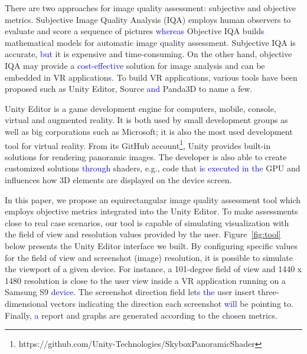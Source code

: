 \documentclass[10pt,conference]{IEEEtran}
\begin{document}
There are two approaches for image quality assessment: subjective and objective metrics. Subjective Image Quality Analysis (IQA) employs human observers to evaluate and score a sequence of pictures \textcolor{blue}{whereas} Objective IQA build\textcolor{blue}{s} mathematical models for automatic image quality assessment. Subjective IQA is accurate, \textcolor{blue}{but} it is expensive and time-consuming. On the other hand, objective IQA may provide a \textcolor{blue}{cost-effective} solution for image analysis and can be embedded in VR application\textcolor{blue}{s}. To build VR applications, various tools have been proposed such as Unity Editor, Source \textcolor{blue}{and} Panda3D to name a few. \par

Unity Editor is a game development engine for computers, mobile, console, virtual and augmented reality. It is both used by small development groups as well as big corporations such as Microsoft; it is also the most used development tool for virtual reality. From its GitHub account\footnote{https://github.com/Unity-Technologies/SkyboxPanoramicShader}, Unity provides built-in solutions for rendering panoramic images. The developer is also able to create customized solutions \textcolor{blue}{through} shaders, e.g., code that \textcolor{blue}{is executed in the}  GPU and influences how 3D elements are displayed on the device screen.

In this paper, we propose an equirectangular image quality assessment tool which employs objective metrics integrated into the Unity Editor. To make assessments close to real case scenarios, our tool is capable of simulating visualization with the field of view and resolution values provided by the user. Figure~\ref{fig:tool} below presents the Unity Editor interface we built. By configuring specific values for the field of view and screenshot (image) resolution, it is possible to simulate the viewport of a given device. For instance, a 101-degree field of view and 1440 x 1480 resolution is close to the user view inside a VR application running on a Samsung S9 \textcolor{blue}{device}. The screenshot direction field let\textcolor{blue}{s the} user insert three-dimensional vectors indicating the direction each screenshot \textcolor{blue}{will} be pointing to. Finally\textcolor{blue}{, a} report and graphs are generated according to the chosen metrics.
\end{document}
